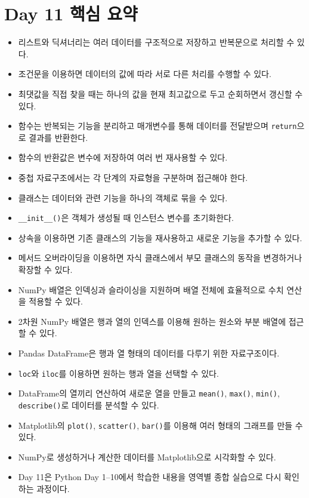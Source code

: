 \documentclass[11pt,a4paper]{article}
\begin{document}
\section{Day 11 핵심 요약}

\begin{itemize}[leftmargin=1.5em]
    \item 리스트와 딕셔너리는 여러 데이터를 구조적으로 저장하고 반복문으로 처리할 수 있다.
    \item 조건문을 이용하면 데이터의 값에 따라 서로 다른 처리를 수행할 수 있다.
    \item 최댓값을 직접 찾을 때는 하나의 값을 현재 최고값으로 두고 순회하면서 갱신할 수 있다.
    \item 함수는 반복되는 기능을 분리하고 매개변수를 통해 데이터를 전달받으며 \texttt{return}으로 결과를 반환한다.
    \item 함수의 반환값은 변수에 저장하여 여러 번 재사용할 수 있다.
    \item 중첩 자료구조에서는 각 단계의 자료형을 구분하며 접근해야 한다.
    \item 클래스는 데이터와 관련 기능을 하나의 객체로 묶을 수 있다.
    \item \texttt{\_\_init\_\_()}은 객체가 생성될 때 인스턴스 변수를 초기화한다.
    \item 상속을 이용하면 기존 클래스의 기능을 재사용하고 새로운 기능을 추가할 수 있다.
    \item 메서드 오버라이딩을 이용하면 자식 클래스에서 부모 클래스의 동작을 변경하거나 확장할 수 있다.
    \item NumPy 배열은 인덱싱과 슬라이싱을 지원하며 배열 전체에 효율적으로 수치 연산을 적용할 수 있다.
    \item 2차원 NumPy 배열은 행과 열의 인덱스를 이용해 원하는 원소와 부분 배열에 접근할 수 있다.
    \item Pandas DataFrame은 행과 열 형태의 데이터를 다루기 위한 자료구조이다.
    \item \texttt{loc}와 \texttt{iloc}를 이용하면 원하는 행과 열을 선택할 수 있다.
    \item DataFrame의 열끼리 연산하여 새로운 열을 만들고 \texttt{mean()}, \texttt{max()}, \texttt{min()}, \texttt{describe()}로 데이터를 분석할 수 있다.
    \item Matplotlib의 \texttt{plot()}, \texttt{scatter()}, \texttt{bar()}를 이용해 여러 형태의 그래프를 만들 수 있다.
    \item NumPy로 생성하거나 계산한 데이터를 Matplotlib으로 시각화할 수 있다.
    \item Day 11은 Python Day 1--10에서 학습한 내용을 영역별 종합 실습으로 다시 확인하는 과정이다.
\end{itemize}
\end{document}
